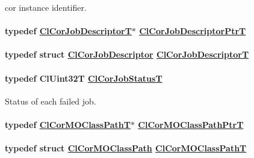 cor instance identifier. \hypertarget{group__group13_ga50}{
\paragraph[ClCorJobDescriptorPtrT]{\setlength{\rightskip}{0pt plus 5cm}typedef \hyperlink{struct_cl_cor_job_descriptor}{Cl\-Cor\-Job\-Descriptor\-T}$\ast$ \hyperlink{struct_cl_cor_job_descriptor}{Cl\-Cor\-Job\-Descriptor\-Ptr\-T}}\hfill}
\label{group__group13_ga50}


\hypertarget{group__group13_ga49}{
\paragraph[ClCorJobDescriptorT]{\setlength{\rightskip}{0pt plus 5cm}typedef struct \hyperlink{struct_cl_cor_job_descriptor}{Cl\-Cor\-Job\-Descriptor} \hyperlink{struct_cl_cor_job_descriptor}{Cl\-Cor\-Job\-Descriptor\-T}}\hfill}
\label{group__group13_ga49}


\hypertarget{group__group13_ga6}{
\paragraph[ClCorJobStatusT]{\setlength{\rightskip}{0pt plus 5cm}typedef Cl\-Uint32T \hyperlink{group__group13_ga6}{Cl\-Cor\-Job\-Status\-T}}\hfill}
\label{group__group13_ga6}


Status of each failed job. \hypertarget{group__group13_ga39}{
\paragraph[ClCorMOClassPathPtrT]{\setlength{\rightskip}{0pt plus 5cm}typedef \hyperlink{struct_cl_cor_m_o_class_path}{Cl\-Cor\-MOClass\-Path\-T}$\ast$ \hyperlink{struct_cl_cor_m_o_class_path}{Cl\-Cor\-MOClass\-Path\-Ptr\-T}}\hfill}
\label{group__group13_ga39}


\hypertarget{group__group13_ga38}{
\paragraph[ClCorMOClassPathT]{\setlength{\rightskip}{0pt plus 5cm}typedef struct \hyperlink{struct_cl_cor_m_o_class_path}{Cl\-Cor\-MOClass\-Path} \hyperlink{struct_cl_cor_m_o_class_path}{Cl\-Cor\-MOClass\-Path\-T}}\hfill}
\label{group__group13_ga38}


